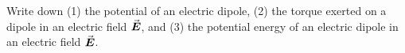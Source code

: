 

\vspace*{\fill}
\centering

Write down (1) the potential of an electric dipole, (2) the torque exerted on a dipole in an electric field $\va*{E}$, and (3) the potential energy of an electric dipole in an electric field $\va*{E}$.

\centering
\vspace*{\fill}

